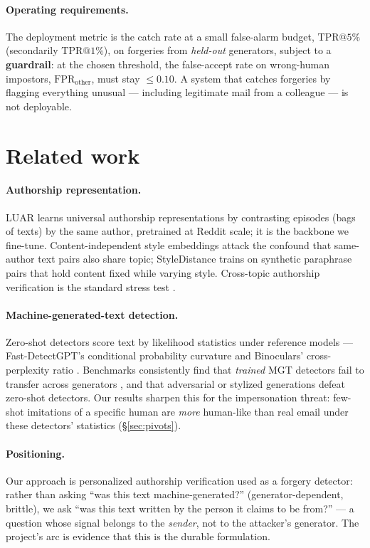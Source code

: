 \documentclass[11pt]{article}
\makeatletter
\newcommand{\fprother}{\ensuremath{\mathrm{FPR}_{\mathrm{other}}}}
\newcommand{\tprat}[1]{\ensuremath{\mathrm{TPR}@#1\%}}
\makeatother
\begin{document}
\paragraph{Operating requirements.} The deployment metric is the catch rate at a small false-alarm
budget, \tprat{5} (secondarily \tprat{1}), on forgeries from \emph{held-out} generators, subject to
a \textbf{guardrail}: at the chosen threshold, the false-accept rate on wrong-human impostors,
\fprother{}, must stay ${\leq}0.10$. A system that catches forgeries by flagging everything
unusual --- including legitimate mail from a colleague --- is not deployable.

\section{Related work}
\label{sec:related}

\paragraph{Authorship representation.} LUAR \citep{riverasoto2021} learns universal authorship
representations by contrasting episodes (bags of texts) by the same author, pretrained at Reddit
scale; it is the backbone we fine-tune. Content-independent style embeddings
\citep{wegmann2022,styledistance2024} attack the confound that same-author text pairs also share
topic; StyleDistance trains on synthetic paraphrase pairs that hold content fixed while varying
style. Cross-topic authorship verification is the standard stress test \citep{kestemont2020}.

\paragraph{Machine-generated-text detection.} Zero-shot detectors score text by likelihood
statistics under reference models --- Fast-DetectGPT's conditional probability curvature
\citep{fastdetectgpt2023} and Binoculars' cross-perplexity ratio \citep{binoculars2024}.
Benchmarks consistently find that \emph{trained} MGT detectors fail to transfer across generators
\citep{raid2024}, and that adversarial or stylized generations defeat zero-shot detectors. Our
results sharpen this for the impersonation threat: few-shot imitations of a specific human are
\emph{more} human-like than real email under these detectors' statistics (\S\ref{sec:pivots}).

\paragraph{Positioning.} Our approach is personalized authorship verification used as a forgery
detector: rather than asking ``was this text machine-generated?'' (generator-dependent, brittle),
we ask ``was this text written by the person it claims to be from?'' --- a question whose signal
belongs to the \emph{sender}, not to the attacker's generator. The project's arc is evidence that
this is the durable formulation.
\end{document}
